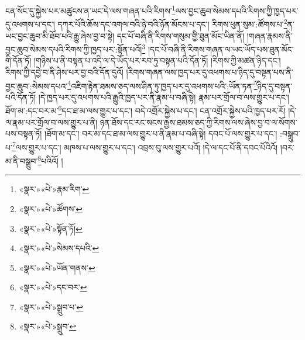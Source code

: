 ངན་སོང་དུ་སྐྱེས་པར་མཚུངས་ན་ཡང་དེ་ལས་གཞན་པའི་རིགས་\footnote{«སྣར་»«པེ་»རྣམ་རིག་}ལས་བྱང་ཆུབ་སེམས་དཔའི་རིགས་ཀྱི་ཁྱད་པར་དུ་འཕགས་པ་དང་། དཀར་པོའི་ཆོས་དང་འགལ་བའི་ཉེ་བའི་ཉོན་མོངས་པ་དང་། རིགས་ཕུན་སུམ་:ཚོགས་པ་\footnote{«སྣར་»«པེ་»ཚོགས་}ན་ཡང་བྱང་ཆུབ་མི་ཐོབ་པའི་རྒྱུ་ཞེས་བྱ་བ་སྟེ། དང་པོ་བཞི་ནི་རིགས་གསུམ་གྱི་ཐུན་མོང་ཡིན་ནོ། །གཞན་རྣམས་ནི་བྱང་ཆུབ་སེམས་དཔའི་རིགས་ཀྱི་ཁྱད་པར་:སྟོན་པའོ།\footnote{«སྣར་»«པེ་»སྟོན་ཏོ།} །དང་པོ་བཞི་ནི་རིགས་གཞན་ལ་ཡང་ཡོད་པས་ཐུན་མོང་གི་དོན་ཏོ། །གཉིས་པ་ནི་བསྟན་པ་འདི་ལ་དེ་ཡོད་པར་རབ་ཏུ་བསྟན་པའི་དོན་ཏོ། །རིགས་ཀྱི་མཚན་ཉིད་དང་། རིགས་ཀྱི་དབྱེ་བ་ནི་ཤེས་པར་བྱ་བའི་དོན་དུའོ། །རིགས་གཞན་ལས་ཁྱད་པར་དུ་འཕགས་པ་ཉིད་དུ་བསྟན་པས་ནི་བྱང་ཆུབ་:སེམས་དཔའ་\footnote{«སྣར་»«པེ་»སེམས་དཔའི་}འཇིག་རྟེན་ཐམས་ཅད་ལས་ཤིན་ཏུ་ཁྱད་པར་དུ་འཕགས་པའི་:ཡོན་ཏན་\footnote{«སྣར་»«པེ་»ཡོན་གནས་}ཉིད་དུ་བསྟན་པའི་དོན་ཏོ། །དེ་ཁྱད་པར་དུ་འཕགས་པའི་རྒྱུའི་ཁྱད་པར་ནི་རྣམ་པ་བཞི་སྟེ། རྣམ་པར་གྲོལ་བ་ལས་གྱུར་པ་དང་། ཐོག་མ་:དང་བར་མ་\footnote{«སྣར་»«པེ་»དང་བར་}དང་ཐ་མ་ལས་གྱུར་པ་དང་། བདེ་འགྲོར་སྐྱེས་པ་དང་། ངན་འགྲོར་སྐྱེས་པའི་ཁྱད་པར་རོ། །དེ་ལ་རྣམ་པར་གྲོལ་བ་ལས་གྱུར་པ་ནི། ཉན་ཐོས་དང་རང་སངས་རྒྱས་ཐམས་ཅད་ཀྱི་རིགས་ལས་ཞེས་བྱ་བ་ལ་སོགས་པས་བསྟན་ཏོ། །ཐོག་མ་དང་། བར་མ་དང་ཐ་མ་ལས་གྱུར་པ་ནི་རྣམ་པ་བཞི་སྟེ། དབང་པོ་ལས་གྱུར་པ་དང་། :བསྒྲུབ་པ་\footnote{«སྣར་»«པེ་»སྒྲུབ་པ་}ལས་གྱུར་པ་དང་། མཁས་པ་ལས་གྱུར་པ་དང་། འབྲས་བུ་ལས་གྱུར་པའོ། །དེ་ལ་དང་པོ་ནི་དབང་པོའིའོ། །བར་མ་ནི་བསྒྲུབ་\footnote{«སྣར་»«པེ་»སྒྲུབ་}པའིའོ། །
